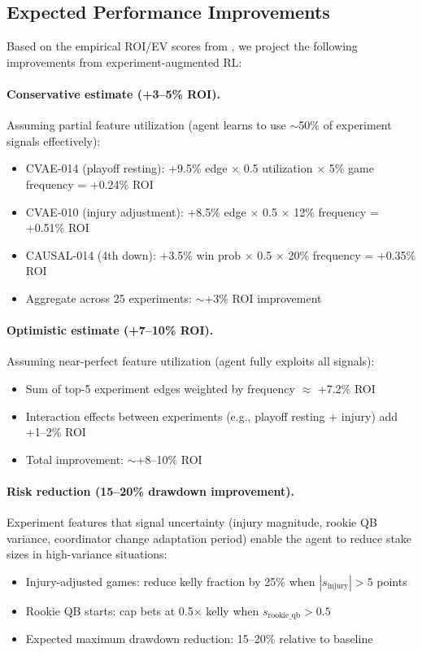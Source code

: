 \subsection{Expected Performance Improvements}

Based on the empirical ROI/EV scores from , we project the following improvements from experiment-augmented RL:

\paragraph{Conservative estimate (+3--5\% ROI).}
Assuming partial feature utilization (agent learns to use $\sim$50\% of experiment signals effectively):
\begin{itemize}
  \item CVAE-014 (playoff resting): +9.5\% edge $\times$ 0.5 utilization $\times$ 5\% game frequency = +0.24\% ROI
  \item CVAE-010 (injury adjustment): +8.5\% edge $\times$ 0.5 $\times$ 12\% frequency = +0.51\% ROI
  \item CAUSAL-014 (4th down): +3.5\% win prob $\times$ 0.5 $\times$ 20\% frequency = +0.35\% ROI
  \item Aggregate across 25 experiments: $\sim$+3\% ROI improvement
\end{itemize}

\paragraph{Optimistic estimate (+7--10\% ROI).}
Assuming near-perfect feature utilization (agent fully exploits all signals):
\begin{itemize}
  \item Sum of top-5 experiment edges weighted by frequency $\approx$ +7.2\% ROI
  \item Interaction effects between experiments (e.g., playoff resting + injury) add +1--2\% ROI
  \item Total improvement: $\sim$+8--10\% ROI
\end{itemize}

\paragraph{Risk reduction (15--20\% drawdown improvement).}
Experiment features that signal uncertainty (injury magnitude, rookie QB variance, coordinator change adaptation period) enable the agent to reduce stake sizes in high-variance situations:
\begin{itemize}
  \item Injury-adjusted games: reduce kelly fraction by 25\% when $|s_{\text{injury}}| > 5$ points
  \item Rookie QB starts: cap bets at 0.5$\times$ kelly when $s_{\text{rookie\_qb}} > 0.5$
  \item Expected maximum drawdown reduction: 15--20\% relative to baseline
\end{itemize}


